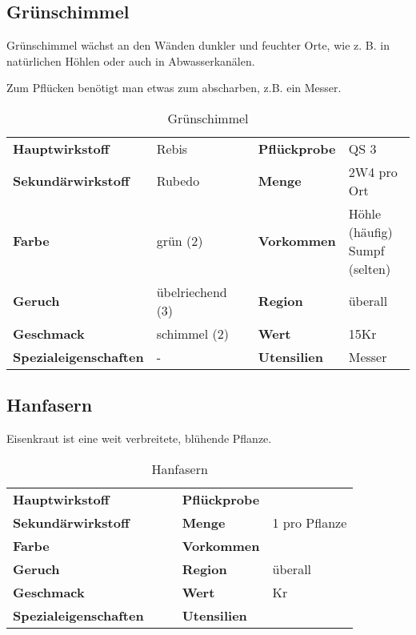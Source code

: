 \subsection{Grünschimmel}
Grünschimmel wächst an den Wänden dunkler und feuchter Orte, wie z. B. in natürlichen Höhlen oder auch in Abwasserkanälen. 

Zum Pflücken benötigt man etwas zum abscharben, z.B. ein Messer.

\begin{table}[h] 
\begin{center} 
\begin{tabular}{|l|l|p{1cm}|l|l|} 
  	\cline{1-2} \cline{4-5} 
  	\textbf{Hauptwirkstoff} & Rebis && \textbf{Pflückprobe} & QS 3 \\ \cline{1-2} \cline{4-5} 
  	\textbf{Sekundärwirkstoff} & Rubedo && \textbf{Menge} & 2W4 pro Ort \\ \cline{1-2} \cline{4-5} 
  	\textbf{Farbe} & grün (2) && \textbf{Vorkommen} & \brcell{Höhle (häufig) \\ Sumpf (selten)} \\ \cline{1-2} \cline{4-5} 
  	\textbf{Geruch} & übelriechend (3) && \textbf{Region} & überall \\ \cline{1-2} \cline{4-5} 
  	\textbf{Geschmack} & schimmel (2) && \textbf{Wert} & 15Kr \\ \cline{1-2} \cline{4-5} 
  	\textbf{Spezialeigenschaften} & - && \textbf{Utensilien} & Messer \\ \cline{1-2} \cline{4-5} 
\end{tabular} 
\end{center} 
\caption{Grünschimmel} 
\label{tab:gruenschimmel} 
\end{table}


\subsection{Hanfasern}
Eisenkraut ist eine weit verbreitete, blühende Pflanze. 

\begin{table}[h]
\begin{center}
\begin{tabular}{|l|l|p{1cm}|l|l|}
	\cline{1-2} \cline{4-5}
	\textbf{Hauptwirkstoff} &  && \textbf{Pflückprobe} &  \\ \cline{1-2} \cline{4-5}
	\textbf{Sekundärwirkstoff} &  && \textbf{Menge} & 1 pro Pflanze \\ \cline{1-2} \cline{4-5}
	\textbf{Farbe} &  && \textbf{Vorkommen} &  \\ \cline{1-2} \cline{4-5}
	\textbf{Geruch} &  && \textbf{Region} & überall \\ \cline{1-2} \cline{4-5}
	\textbf{Geschmack} &  && \textbf{Wert} & Kr \\ \cline{1-2} \cline{4-5}
	\textbf{Spezialeigenschaften} &  && \textbf{Utensilien} &  \\ \cline{1-2} \cline{4-5}
\end{tabular}
\end{center}
\caption{Hanfasern}
\label{tab:hanfasern}
\end{table}



